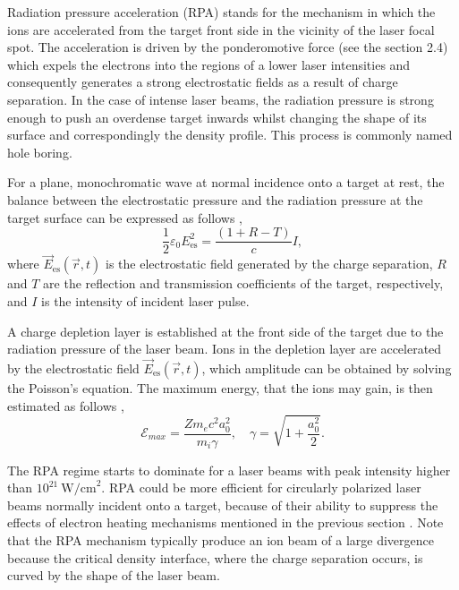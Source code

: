 Radiation pressure acceleration (RPA) stands for the mechanism in which the ions are accelerated from the target front side in the vicinity of the laser focal spot. The acceleration is driven by the ponderomotive force (see the section 2.4) which expels the electrons into the regions of a lower laser intensities and consequently generates a strong electrostatic fields as a result of charge separation. In the case of intense laser beams, the radiation pressure is strong enough to push an overdense target inwards whilst changing the shape of its surface and correspondingly the density profile. This process is commonly named hole boring.

For a plane, monochromatic wave at normal incidence onto a target at rest, the balance between the electrostatic pressure and the radiation pressure at the target surface can be expressed as follows \cite{Macchi2013},
\begin{equation}
\label{2.7.1.1}
\frac{1}{2} \varepsilon_0 E_{\mathrm{es}}^2 = \frac{\left( 1 + R - T \right)}{c} I,
\end{equation}
where $ \vec{E}_{\mathrm{es}} \left(\vec{r}, t \right) $ is the electrostatic field generated by the charge separation, $ R $ and $ T $ are the reflection and transmission coefficients of the target, respectively, and $ I $ is the intensity of incident laser pulse.

A charge depletion layer is established at the front side of the target due to the radiation pressure of the laser beam. Ions in the depletion layer are accelerated by the electrostatic field $ \vec{E}_{\mathrm{es}} \left(\vec{r}, t \right) $, which amplitude can be obtained by solving the Poisson's equation. The maximum energy, that the ions may gain, is then estimated as follows \cite{Macchi2013},
\begin{equation}
\mathcal{E}_{max} = \frac{Z m_e c^2 a_0^2}{m_i \gamma}, \quad \gamma = \sqrt{1 + \frac{a_0^2}{2}}.
\end{equation}
 
The RPA regime starts to dominate for a laser beams with peak intensity higher than $ 10^{21} \  \mathrm{W/cm}^2 $. RPA could be more efficient for circularly polarized laser beams normally incident onto a target, because of their ability to suppress the effects of electron heating mechanisms mentioned in the previous section \cite{Zhang2007, Klimo2008}. Note that the RPA mechanism typically produce an ion beam of a large divergence because the critical density interface, where the charge separation occurs, is curved by the shape of the laser beam.

